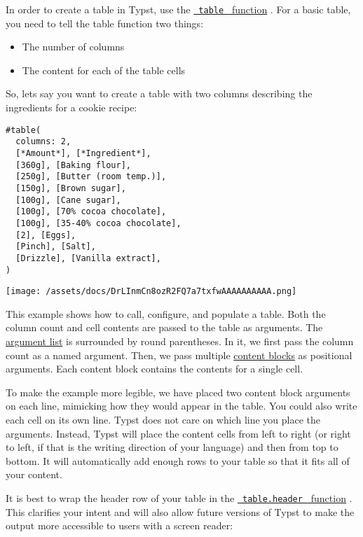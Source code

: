 In order to create a table in Typst, use the
\href{/docs/reference/model/table/}{\texttt{\ table\ } function} . For a
basic table, you need to tell the table function two things:

\begin{itemize}
\tightlist
\item
  The number of columns
\item
  The content for each of the table cells
\end{itemize}

So, let\textquotesingle s say you want to create a table with two
columns describing the ingredients for a cookie recipe:

\begin{verbatim}
#table(
  columns: 2,
  [*Amount*], [*Ingredient*],
  [360g], [Baking flour],
  [250g], [Butter (room temp.)],
  [150g], [Brown sugar],
  [100g], [Cane sugar],
  [100g], [70% cocoa chocolate],
  [100g], [35-40% cocoa chocolate],
  [2], [Eggs],
  [Pinch], [Salt],
  [Drizzle], [Vanilla extract],
)
\end{verbatim}

\texttt{[image: /assets/docs/DrLInmCn8ozR2FQ7a7txfwAAAAAAAAAA.png]}

This example shows how to call, configure, and populate a table. Both
the column count and cell contents are passed to the table as arguments.
The \href{/docs/reference/foundations/function/}{argument list} is
surrounded by round parentheses. In it, we first pass the column count
as a named argument. Then, we pass multiple
\href{/docs/reference/foundations/content/}{content blocks} as
positional arguments. Each content block contains the contents for a
single cell.

To make the example more legible, we have placed two content block
arguments on each line, mimicking how they would appear in the table.
You could also write each cell on its own line. Typst does not care on
which line you place the arguments. Instead, Typst will place the
content cells from left to right (or right to left, if that is the
writing direction of your language) and then from top to bottom. It will
automatically add enough rows to your table so that it fits all of your
content.

It is best to wrap the header row of your table in the
\href{/docs/reference/model/table/\#definitions-header}{\texttt{\ table.header\ }
function} . This clarifies your intent and will also allow future
versions of Typst to make the output more accessible to users with a
screen reader:

